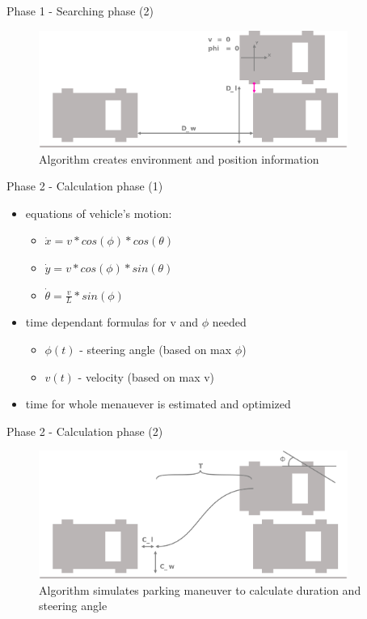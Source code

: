 \documentclass[aspectratio=169]{beamer}
\begin{document}
  \begin{frame}{Phase 1 - Searching phase (2)}
  	\begin{figure} [ht]
  		\centering
  		\includegraphics[width=0.9\textwidth]{david_images/FindLot2.png}
  		\caption{\tiny Algorithm creates environment and position information}
	\end{figure}
  \end{frame}
  
  \begin{frame}{Phase 2 - Calculation phase (1)}
    	\begin{itemize}
  		\item<1-> equations of vehicle's motion:
  			\begin{itemize}
  				\item<2-> $\dot{x} = v * cos(\phi) * cos(\theta)$
  				\item<3-> $\dot{y} = v * cos(\phi) * sin(\theta)$ 
  				\item<4-> $\dot{\theta} = \frac{v}{L} * sin(\phi)$ 
  			\end{itemize}
  		\item<5-> time dependant formulas for v and $\phi$ needed
  			\begin{itemize}
  				\item<6-> $\phi(t)$ - steering angle (based on max $\phi$)
  				\item<7-> $v(t)$ - velocity (based on max v)
  			\end{itemize}
  		\item<8-> time for whole menauever is estimated and optimized
  	\end{itemize}
  \end{frame}
  
  \begin{frame}{Phase 2 - Calculation phase (2)}
  	\begin{figure} [ht]
  		\centering
  		\includegraphics[width=0.9\textwidth]{david_images/Calculating.png}
  		\caption{\tiny Algorithm simulates parking maneuver to calculate duration and steering angle}
	\end{figure}
  \end{frame}
  
\end{document}
